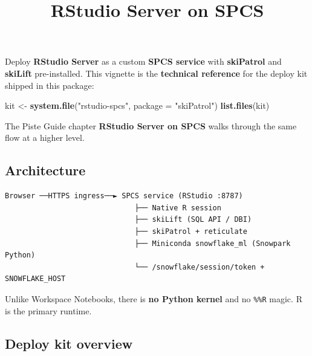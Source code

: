 \documentclass[
]{article}
\title{RStudio Server on SPCS}
\author{}
\date{\vspace{-2.5em}}
\newenvironment{Shaded}{\begin{snugshade}}{\end{snugshade}}
\newcommand{\AttributeTok}[1]{\textcolor[rgb]{0.13,0.29,0.53}{#1}}
\newcommand{\FunctionTok}[1]{\textcolor[rgb]{0.13,0.29,0.53}{\textbf{#1}}}
\newcommand{\NormalTok}[1]{#1}
\newcommand{\OtherTok}[1]{\textcolor[rgb]{0.56,0.35,0.01}{#1}}
\newcommand{\StringTok}[1]{\textcolor[rgb]{0.31,0.60,0.02}{#1}}
\begin{document}
\maketitle

Deploy \textbf{RStudio Server} as a custom \textbf{SPCS service} with
\textbf{skiPatrol} and \textbf{skiLift} pre-installed. This vignette
is the \textbf{technical reference} for the deploy kit shipped in this
package:

\begin{Shaded}
\begin{Highlighting}[]
\NormalTok{kit }\OtherTok{\textless{}{-}} \FunctionTok{system.file}\NormalTok{(}\StringTok{"rstudio{-}spcs"}\NormalTok{, }\AttributeTok{package =} \StringTok{"skiPatrol"}\NormalTok{)}
\FunctionTok{list.files}\NormalTok{(kit)}
\end{Highlighting}
\end{Shaded}

The Piste Guide chapter \textbf{RStudio Server on SPCS} walks
through the same flow at a higher level.

\subsection{Architecture}\label{architecture}

\begin{verbatim}
Browser ──HTTPS ingress──► SPCS service (RStudio :8787)
                              ├── Native R session
                              ├── skiLift (SQL API / DBI)
                              ├── skiPatrol + reticulate
                              ├── Miniconda snowflake_ml (Snowpark Python)
                              └── /snowflake/session/token + SNOWFLAKE_HOST
\end{verbatim}

Unlike Workspace Notebooks, there is \textbf{no Python kernel} and no
\texttt{\%\%R} magic. R is the primary runtime.

\subsection{Deploy kit overview}\label{deploy-kit-overview}
\end{document}
